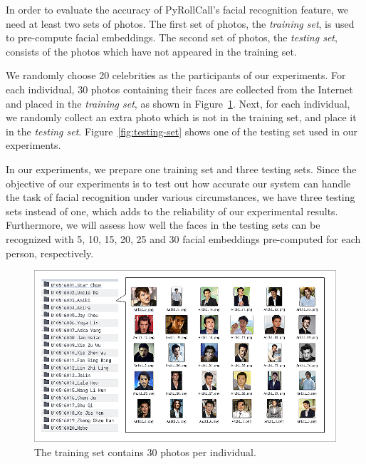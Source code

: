 In order to evaluate the accuracy of PyRollCall's facial recognition feature, we need at least two sets of photos.
The first set of photos, the \emph{training set}, is used to pre-compute facial embeddings.
The second set of photos, the \emph{testing set}, consists of the photos which have not appeared in the training set.
\vspace{0.5cm}

We randomly choose 20 celebrities as the participants of our experiments. For each individual, 30 photos
containing their faces are collected from the Internet and placed in the \emph{training set}, as shown in Figure~\ref{fig:training-set}.
Next, for each individual, we randomly collect an extra photo which is not in the training set, and place it in the \emph{testing set}.
Figure~\ref{fig:testing-set} shows one of the testing set used in our experiments.
\vspace{0.5cm}

In our experiments, we prepare one training set and three testing sets. Since the objective of our experiments is to test out
how accurate our system can handle the task of facial recognition under various circumstances,
we have three testing sets instead of one, which adds to the reliability of our experimental results.
Furthermore, we will assess how well the faces in the testing sets can be recognized with 5, 10, 15, 20, 25 and 30
facial embeddings pre-computed for each person, respectively.
\vspace{0.2cm}

\begin{figure}[!htb]
  \centering
  \includegraphics[width=\linewidth]{figures/training-set.png}
  \caption{The training set contains 30 photos per individual.}
  \label{fig:training-set}
\end{figure}
\vspace{0.5cm}

